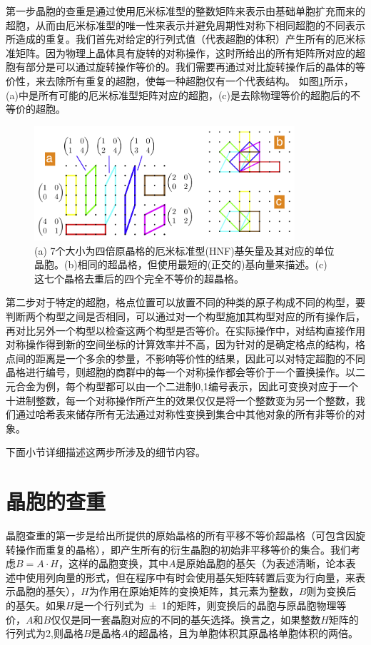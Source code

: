 第一步晶胞的查重是通过使用厄米标准型的整数矩阵来表示由基础单胞扩充而来的超胞，从而由厄米标准型的唯一性来表示并避免周期性对称下相同超胞的不同表示所造成的重复。我们首先对给定的行列式值（代表超胞的体积）产生所有的厄米标准矩阵。因为物理上晶体具有旋转的对称操作，这时所给出的所有矩阵所对应的超胞有部分是可以通过旋转操作等价的。我们需要再通过对比旋转操作后的晶体的等价性，来去除所有重复的超胞，使每一种超胞仅有一个代表结构。
如图\ref{fig:ch4_2d_square_lattice}所示，(a)中是所有可能的厄米标准型矩阵对应的超胞，(c)是去除物理等价的超胞后的不等价的超胞。

\begin{figure}
  \includegraphics[width=0.86\textwidth]{figs/ch4_2d_square_lattice.png}
  \caption{(a) 7个大小为四倍原晶格的厄米标准型(HNF)基矢量及其对应的单位晶胞。(b)相同的超晶格，但使用最短的(正交的)基向量来描述。(c)这七个晶格去重后的四个完全不等价的超晶格。}
  \label{fig:ch4_2d_square_lattice}
\end{figure}

第二步对于特定的超胞，格点位置可以放置不同的种类的原子构成不同的构型，要判断两个构型之间是否相同，可以通过对一个构型施加其构型对应的所有操作后，再对比另外一个构型以检查这两个构型是否等价。在实际操作中，对结构直接作用对称操作得到新的空间坐标的计算效率并不高，因为针对的是确定格点的结构，格点间的距离是一个多余的参量，不影响等价性的结果，因此可以对特定超胞的不同晶格进行编号，则超胞的商群中的每一个对称操作都会等价于一个置换操作。以二元合金为例，每个构型都可以由一个二进制0,1编号表示，因此可变换对应于一个十进制整数，每一个对称操作所产生的效果仅仅是将一个整数变为另一个整数，我们通过哈希表来储存所有无法通过对称性变换到集合中其他对象的所有非等价的对象。

下面小节详细描述这两步所涉及的细节内容。

\section{晶胞的查重}
晶胞查重的第一步是给出所提供的原始晶格的所有平移不等价超晶格（可包含因旋转操作而重复的晶格），即产生所有的衍生晶胞的初始非平移等价的集合。我们考虑$B=A\cdot H$，这样的晶胞变换，其中$A$是原始晶胞的基矢（为表述清晰，论本表述中使用列向量的形式，但在程序中有时会使用基矢矩阵转置后变为行向量，来表示晶胞的基矢），$H$为作用在原始矩阵的变换矩阵，其元素为整数，$B$则为变换后的基矢。如果$H$是一个行列式为\num{+-1}的矩阵，则变换后的晶胞与原晶胞物理等价，$A$和$B$仅仅是同一套晶胞对应的不同的基矢选择。换言之，如果整数$H$矩阵的行列式为\num{2},则晶格$B$是晶格$A$的超晶格，且为单胞体积其原晶格单胞体积的两倍。

